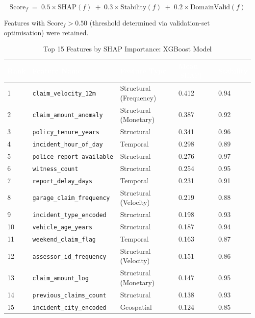 \documentclass[12pt,a4paper,oneside]{report}
\numberwithin{equation}{chapter}
\renewcommand{\arraystretch}{1.6}
\begin{document}
\begin{equation}
\text{Score}_{f} \;=\; 0.5\times\text{SHAP}(f)
                 \;+\; 0.3\times\text{Stability}(f)
                 \;+\; 0.2\times\text{DomainValid}(f)
\label{eq:feature_score}
\end{equation}

Features with $\text{Score}_{f} > 0.50$ (threshold determined via validation-set optimisation)
were retained.

\begin{table}[H]
\centering
\caption{Top 15 Features by SHAP Importance: XGBoost Model}
\label{tab:shap_features}
\renewcommand{\arraystretch}{1.4}
\begin{tabular}{C{0.9cm} L{5.9cm} L{3.0cm} C{2.2cm} C{2.2cm}}
\toprule
{}
\textcolor{white}{\textbf{Rank}} &
\textcolor{white}{\textbf{Feature Name}} &
\textcolor{white}{\textbf{Feature Type}} &
\textcolor{white}{\textbf{Mean $|\text{SHAP}|$}} &
\textcolor{white}{\textbf{Stability}} \\
\midrule
{}
1  & \texttt{claim\_velocity\_12m}      & Structural (Frequency) & 0.412 & 0.94 \\
2  & \texttt{claim\_amount\_anomaly}    & Structural (Monetary)  & 0.387 & 0.92 \\
3  & \texttt{policy\_tenure\_years}     & Structural             & 0.341 & 0.96 \\
4  & \texttt{incident\_hour\_of\_day}   & Temporal               & 0.298 & 0.89 \\
5  & \texttt{police\_report\_available} & Structural             & 0.276 & 0.97 \\
6  & \texttt{witness\_count}            & Structural             & 0.254 & 0.95 \\
7  & \texttt{report\_delay\_days}       & Temporal               & 0.231 & 0.91 \\
8  & \texttt{garage\_claim\_frequency}  & Structural (Velocity)  & 0.219 & 0.88 \\
9  & \texttt{incident\_type\_encoded}   & Structural             & 0.198 & 0.93 \\
10 & \texttt{vehicle\_age\_years}       & Structural             & 0.187 & 0.94 \\
11 & \texttt{weekend\_claim\_flag}      & Temporal               & 0.163 & 0.87 \\
12 & \texttt{assessor\_id\_frequency}   & Structural (Velocity)  & 0.151 & 0.86 \\
13 & \texttt{claim\_amount\_log}        & Structural (Monetary)  & 0.147 & 0.95 \\
14 & \texttt{previous\_claims\_count}   & Structural             & 0.138 & 0.93 \\
15 & \texttt{incident\_city\_encoded}   & Geospatial             & 0.124 & 0.85 \\
\bottomrule
\end{tabular}
\end{table}
\end{document}

